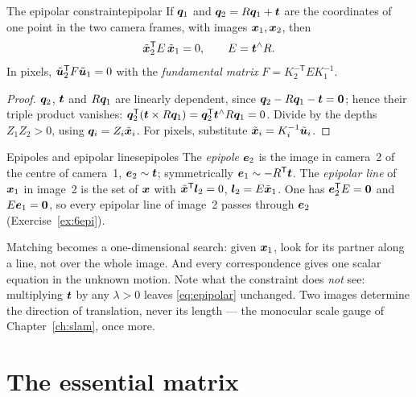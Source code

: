 \begin{proposition}{The epipolar constraint}{epipolar}
If $\bm{q}_1$ and $\bm{q}_2=R\bm{q}_1+\bm{t}$ are the coordinates
of one point in the two camera frames, with images $\bm{x}_1,
\bm{x}_2$, then
\begin{equation}\label{eq:epipolar}
\tilde{\bm{x}}_2^{\mathsf{T}} E\,\tilde{\bm{x}}_1=0,\qquad E=\bm{t}^{\wedge}R .
\end{equation}
In pixels, $\tilde{\bm{u}}_2^{\mathsf{T}} F\tilde{\bm{u}}_1=0$ with the
\emph{fundamental matrix} $F=K_2^{-\mathsf T}EK_1^{-1}$.
\end{proposition}

\begin{proof}
$\bm{q}_2$, $\bm{t}$ and $R\bm{q}_1$ are linearly dependent, since
$\bm{q}_2-R\bm{q}_1-\bm{t}=\bm{0}$; hence their triple product
vanishes: $\bm{q}_2^{\mathsf{T}}(\bm{t}\times R\bm{q}_1)=\bm{q}_2^{\mathsf{T}}
\bm{t}^{\wedge}R\bm{q}_1=0$. Divide by the depths $Z_1Z_2>0$, using
$\bm{q}_i=Z_i\tilde{\bm{x}}_i$. For pixels, substitute
$\tilde{\bm{x}}_i=K_i^{-1}\tilde{\bm{u}}_i$.
\end{proof}

\begin{definition}{Epipoles and epipolar lines}{epipoles}
The \emph{epipole} $\bm{e}_2$ is the image in camera~2 of the centre of
camera~1, $\bm{e}_2\sim\bm{t}$; symmetrically $\bm{e}_1\sim
-R^{\mathsf{T}}\bm{t}$. The \emph{epipolar line} of $\bm{x}_1$ in image~2 is the
set of $\bm{x}$ with $\tilde{\bm{x}}^{\mathsf{T}}\bm{l}_2=0$, $\bm{l}_2=E
\tilde{\bm{x}}_1$. One has $\bm{e}_2^{\mathsf{T}} E=\bm{0}$ and $E\bm{e}_1=
\bm{0}$, so every epipolar line of image~2 passes through $\bm{e}_2$
(Exercise~\ref{ex:6epi}).
\end{definition}

\begin{inwords}
Matching becomes a one-dimensional search: given $\bm{x}_1$, look for
its partner along a line, not over the whole image. And every
correspondence gives one scalar equation in the unknown motion. Note
what the constraint does \emph{not} see: multiplying $\bm{t}$ by any
$\lambda>0$ leaves \eqref{eq:epipolar} unchanged. Two images determine
the direction of translation, never its length --- the monocular scale
gauge of Chapter~\ref{ch:slam}, once more.
\end{inwords}

\section{The essential matrix}

